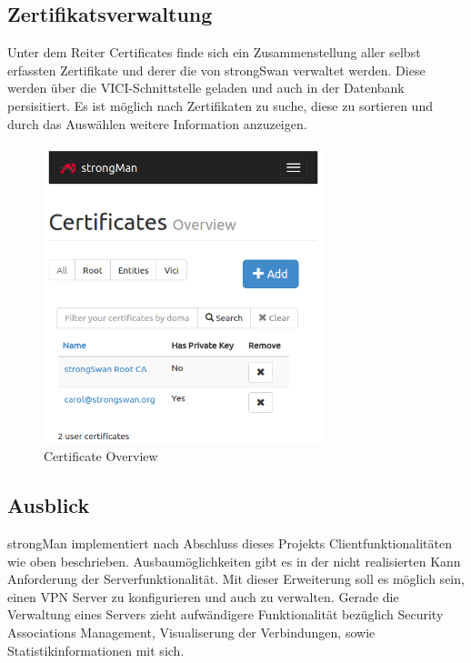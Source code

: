 \noindent\begin{minipage}[t]{0.5\textwidth}
\vspace{0pt}
\subsection{Zertifikatsverwaltung}
Unter dem Reiter Certificates finde sich ein Zusammenstellung aller selbst erfassten Zertifikate und derer die von strongSwan verwaltet werden. Diese werden über die VICI-Schnittstelle geladen und auch in der Datenbank persisitiert. Es ist möglich nach Zertifikaten zu suche, diese zu sortieren und durch das Auswählen weitere Information anzuzeigen.
\end{minipage}
\hfill
\begin{minipage}[t]{0.5\textwidth}
\vspace{0pt}
    \begin{figure}[H]
    	\centering
    	\includegraphics[width=230pt]{images/certificate_overview.png}
    	\caption{Certificate Overview}
    \end{figure}
\end{minipage}
\newpage

\subsection{Ausblick}
strongMan implementiert nach Abschluss dieses Projekts Clientfunktionalitäten wie oben beschrieben. Ausbaumöglichkeiten gibt es in der nicht realisierten Kann Anforderung der Serverfunktionalität. Mit dieser Erweiterung soll es möglich sein, einen VPN Server zu konfigurieren und auch zu verwalten. Gerade die Verwaltung eines Servers zieht aufwändigere Funktionalität bezüglich Security Associations Management, Visualiserung der Verbindungen, sowie Statistikinformationen mit sich.\\ 


